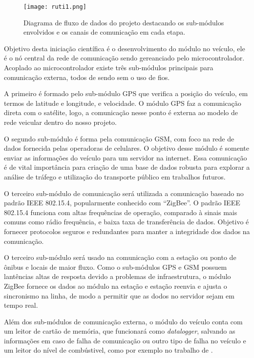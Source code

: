 \documentclass[12pt,report]{uftpibic}
\begin{document}
\begin{figure}[!htpb]
\centering
\caption{Diagrama de fluxo de dados do projeto destacando os sub-módulos envolvidos e os canais de comunicação em cada etapa.}
\texttt{[image: ruti1.png]}
\label{fig:projeto}
\end{figure}

Objetivo desta iniciação científica é o desenvolvimento do módulo no veículo, ele é o nó central da rede de comunicação sendo gereanciado pelo microcontrolador. Acoplado ao microcontrolador existe três sub-módulos principais para comunicação externa, todos de sendo sem o uso de fios. 

A primeiro é formado pelo sub-módulo GPS que verifica a posição do veículo, em termos de latitude e longitude, e velocidade. O módulo GPS faz a comunicação direta com o satélite, logo, a comunicação nesse ponto é externa ao modelo de rede veicular dentro do nosso projeto. 

O segundo sub-módulo é forma pela comunicação GSM, com foco na rede de dados fornecida pelas operadoras de celulares. O objetivo desse módulo é somente enviar as informações do veículo para um servidor na internet. Essa comunicação é de vital importância para criação de uma base de dados robusta para explorar a análise de tráfego e utilização do transporte público em trabalhos futuros.

O terceiro sub-módulo de comunicação será utilizada a comunicação baseado no padrão IEEE 802.15.4, popularmente conhecido com ``ZigBee''. O padrão IEEE 802.15.4 funciona com altas frequências de operação, comparado à sinais mais comuns como rádio frequência, e baixa taxa de transferência de dados. Objetivo é fornecer protocolos seguros e redundantes para manter a integridade dos dados na comunicação. 

O terceiro sub-módulo será usado na comunicação com a estação ou ponto de ônibus e locais de maior fluxo. Como o sub-módulos GPS e GSM possuem lantências altas de resposta devido a problemas de infraestrutura, o módulo ZigBee fornece os dados ao módulo na estação e estação reenvia e ajusta o sincronismo na linha, de modo a permitir que as dodos no servidor sejam em tempo real.

Além dos sub-módulos de comunicação externa, o módulo do veículo conta com um leitor de cartão de memória, que funcionará como \textit{datalogger}, salvando as informações em caso de falha de comunicação ou outro tipo de falha no veículo e um leitor do nível de combústivel, como por exemplo no trabalho de . 
\end{document}
